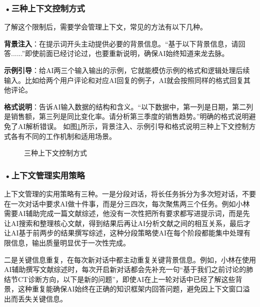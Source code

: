 \subsubsection*{\textbf{•三种上下文控制方式}}

了解这个限制后，需要学会管理上下文，常见的方法有以下几种。

\textbf{背景注入}：在提示词开头主动提供必要的背景信息。“基于以下背景信息，请回答......”即使前面已经讨论过，也要重新说明，确保AI始终知道来龙去脉。

\textbf{示例引导}：给AI两三个输入输出的示例，它就能模仿示例的格式和逻辑处理后续输入。比如给两个用户评论和对应AI回复的例子，AI就会按照同样的格式回复其他评论。

\textbf{格式说明}：告诉AI输入数据的结构和含义。“以下数据中，第一列是日期，第二列是销售额，第三列是同比变化率。请分析第三季度的销售趋势。”明确的格式说明避免了AI解析错误。 如图\ref{fig:ch3_3_7}所示，背景注入、示例引导和格式说明三种上下文控制方式各有不同的工作机制和适用场景。

\begin{figure}[H]
\centering
{}
\caption{三种上下文控制方式}
\label{fig:ch3_3_7}
\end{figure}



\subsubsection*{\textbf{•上下文管理实用策略}}


上下文管理的实用策略有三种。一是分段对话，将长任务拆分为多次短对话，不要在一次对话中要求AI做十件事，而是分三四次，每次聚焦两三个任务。例如小林需要AI辅助完成一篇文献综述，他没有一次性把所有要求都写进提示词，而是先让AI搜索和整理核心文献，得到结果后再让AI分析文献之间的相互关系，最后才让AI基于前两步的结果撰写综述，这种分段策略使AI在每个阶段都能集中处理有限信息，输出质量明显优于一次性完成。

二是关键信息重复，在每次新对话中都主动重复关键背景信息。例如，小林在使用AI辅助撰写文献综述时，每次开启新对话都会先补充一句“基于我们之前讨论的肺结节CT诊断方向，以下是新的问题”，即使AI在上一轮对话中已经了解这些背景，这种重复能确保AI始终在正确的知识框架内回答问题，避免因上下文窗口溢出而丢失关键信息。


